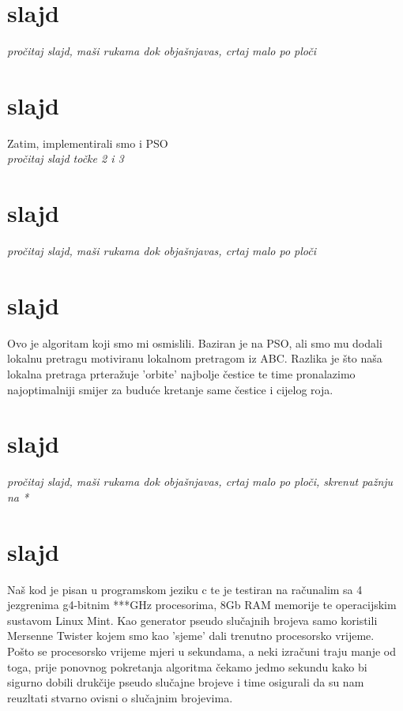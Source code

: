 \documentclass[a4paper,10pt]{article}
\begin{document}
\section{slajd}
\emph{pro\v citaj slajd, ma\v si rukama dok obja\v snjavas, crtaj malo po plo\v ci}

\section{slajd}
Zatim, implementirali smo i PSO\\
\emph{pro\v citaj slajd to\v cke 2 i 3}

\section{slajd}
\emph{pro\v citaj slajd, ma\v si rukama dok obja\v snjavas, crtaj malo po plo\v ci}

\section{slajd}
Ovo je algoritam koji smo mi osmislili. Baziran je na PSO, ali smo mu dodali lokalnu pretragu motiviranu lokalnom pretragom iz ABC. Razlika je \v sto na\v sa lokalna pretraga prtera\v zuje 'orbite' najbolje \v cestice te time pronalazimo najoptimalniji smijer za budu\' ce kretanje same \v cestice i cijelog roja.


\section{slajd}
\emph{pro\v citaj slajd, ma\v si rukama dok obja\v snjavas, crtaj malo po plo\v ci, skrenut pa\v znju na *}

\section{slajd}
Na\v s kod je pisan u programskom jeziku c te je testiran na ra\v cunalim sa 4 jezgrenima g4-bitnim ***GHz procesorima, 8Gb RAM memorije te operacijskim sustavom Linux Mint. Kao  generator pseudo slu\v cajnih brojeva samo koristili Mersenne Twister kojem smo kao 'sjeme' dali trenutno procesorsko vrijeme.\\
Po\v sto se procesorsko vrijeme mjeri u sekundama, a neki izra\v cuni traju manje od toga, prije ponovnog pokretanja algoritma \v cekamo jedmo sekundu kako bi sigurno dobili druk\v cije pseudo slu\v cajne brojeve i time osigurali da su nam reuzltati stvarno ovisni o slu\v cajnim brojevima.
\end{document}

